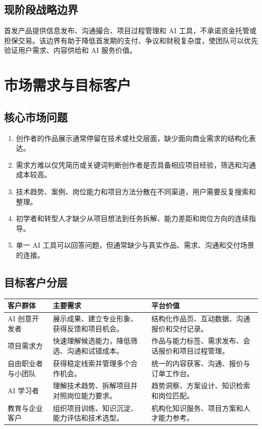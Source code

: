 \documentclass[12pt,a4paper,openany,fontset=fandol]{ctexrep}
\begin{document}
\section{现阶段战略边界}

首发产品提供信息发布、沟通撮合、项目过程管理和 AI 工具，不承诺资金托管或担保交易。该边界有助于降低首发期的支付、争议和财税复杂度，使团队可以优先验证用户需求、内容供给和 AI 服务价值。

\chapter{市场需求与目标客户}

\section{核心市场问题}

\begin{enumerate}
  \item 创作者的作品展示通常停留在技术或社交层面，缺少面向商业需求的结构化表达。
  \item 需求方难以仅凭简历或关键词判断创作者是否具备相应项目经验，筛选和沟通成本较高。
  \item 技术趋势、案例、岗位能力和项目方法分散在不同渠道，用户需要反复搜索和整理。
  \item 初学者和转型人才缺少从项目想法到任务拆解、能力差距和岗位方向的连续指导。
  \item 单一 AI 工具可以回答问题，但通常缺少与真实作品、需求、沟通和交付场景的连接。
\end{enumerate}

\section{目标客户分层}

\begin{longtable}{p{3.2cm} p{5.2cm} p{5.3cm}}
\toprule
客户群体 & 主要需求 & 平台价值 \\
\midrule
AI 创意开发者 & 展示成果、建立专业形象、获得反馈和项目机会。 & 结构化作品页、互动数据、沟通报价和交付记录。 \\
项目需求方 & 快速理解候选能力，降低筛选、沟通和试错成本。 & 作品与能力标签、需求发布、会话报价和项目过程管理。 \\
{\raggedright 自由职业者与小团队\par} & 获得稳定线索并管理多个合作机会。 & 统一的内容获客、沟通、报价与订单工作台。 \\
AI 学习者 & 理解技术趋势、拆解项目并对照岗位能力要求。 & 趋势洞察、方案设计、知识检索和岗位匹配。 \\
教育与企业客户 & 组织项目训练、知识沉淀、能力评估和技术选型。 & 机构化知识服务、项目方案和人才能力参考。 \\
\bottomrule
\end{longtable}
\end{document}
